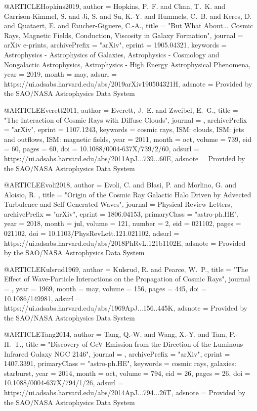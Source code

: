 \documentclass[useAMS,usenatbib]{mnras}
\begin{document}
{{{{{{@ARTICLE{Hopkins2019,
   author = {{Hopkins}, P.~F. and {Chan}, T.~K. and {Garrison-Kimmel}, S. and 
	{Ji}, S. and {Su}, K.-Y. and {Hummels}, C.~B. and {Keres}, D. and 
	{Quataert}, E. and {Faucher-Giguere}, C.-A.},
    title = "{But What About... Cosmic Rays, Magnetic Fields, Conduction, {\amp} Viscosity in Galaxy Formation}",
  journal = {arXiv e-prints},
archivePrefix = "arXiv",
   eprint = {1905.04321},
 keywords = {Astrophysics - Astrophysics of Galaxies, Astrophysics - Cosmology and Nongalactic Astrophysics, Astrophysics - High Energy Astrophysical Phenomena},
     year = 2019,
    month = may,
   adsurl = {https://ui.adsabs.harvard.edu/abs/2019arXiv190504321H},
  adsnote = {Provided by the SAO/NASA Astrophysics Data System}
}

@ARTICLE{Everett2011,
   author = {{Everett}, J.~E. and {Zweibel}, E.~G.},
    title = "{The Interaction of Cosmic Rays with Diffuse Clouds}",
  journal = {\apj},
archivePrefix = "arXiv",
   eprint = {1107.1243},
 keywords = {cosmic rays, ISM: clouds, ISM: jets and outflows, ISM: magnetic fields},
     year = 2011,
    month = oct,
   volume = 739,
      eid = {60},
    pages = {60},
      doi = {10.1088/0004-637X/739/2/60},
   adsurl = {https://ui.adsabs.harvard.edu/abs/2011ApJ...739...60E},
  adsnote = {Provided by the SAO/NASA Astrophysics Data System}
}


@ARTICLE{Evoli2018,
   author = {{Evoli}, C. and {Blasi}, P. and {Morlino}, G. and {Aloisio}, R.
	},
    title = "{Origin of the Cosmic Ray Galactic Halo Driven by Advected Turbulence and Self-Generated Waves}",
  journal = {Physical Review Letters},
archivePrefix = "arXiv",
   eprint = {1806.04153},
 primaryClass = "astro-ph.HE",
     year = 2018,
    month = jul,
   volume = 121,
   number = 2,
      eid = {021102},
    pages = {021102},
      doi = {10.1103/PhysRevLett.121.021102},
   adsurl = {https://ui.adsabs.harvard.edu/abs/2018PhRvL.121b1102E},
  adsnote = {Provided by the SAO/NASA Astrophysics Data System}
}

@ARTICLE{Kulsrud1969,
   author = {{Kulsrud}, R. and {Pearce}, W.~P.},
    title = "{The Effect of Wave-Particle Interactions on the Propagation of Cosmic Rays}",
  journal = {\apj},
     year = 1969,
    month = may,
   volume = 156,
    pages = {445},
      doi = {10.1086/149981},
   adsurl = {https://ui.adsabs.harvard.edu/abs/1969ApJ...156..445K},
  adsnote = {Provided by the SAO/NASA Astrophysics Data System}
}

@ARTICLE{Tang2014,
   author = {{Tang}, Q.-W. and {Wang}, X.-Y. and {Tam}, P.-H.~T.},
    title = "{Discovery of GeV Emission from the Direction of the Luminous Infrared Galaxy NGC 2146}",
  journal = {\apj},
archivePrefix = "arXiv",
   eprint = {1407.3391},
 primaryClass = "astro-ph.HE",
 keywords = {cosmic rays, galaxies: starburst},
     year = 2014,
    month = oct,
   volume = 794,
      eid = {26},
    pages = {26},
      doi = {10.1088/0004-637X/794/1/26},
   adsurl = {https://ui.adsabs.harvard.edu/abs/2014ApJ...794...26T},
  adsnote = {Provided by the SAO/NASA Astrophysics Data System}
}

}}}}}}
\end{document}
